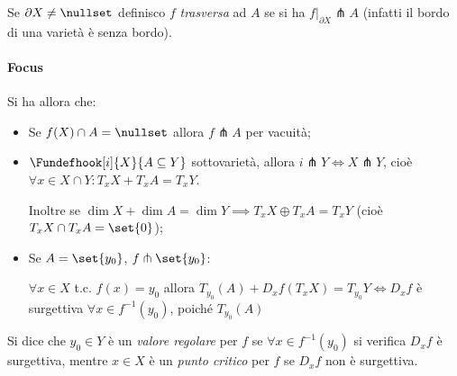 \begin{defn}
Se $\partial X \neq \nullset$ definisco $f$ \emph{trasversa} ad $A$ se si ha $f|_{\partial X} \pitchfork A$ (infatti il bordo di una varietà è senza bordo).
\end{defn}

\paragraph{Focus}
Si ha allora che:
\begin{itemize}
\item Se $f(X) \cap A = \nullset$ allora $f \pitchfork A$ per vacuità;
\item $\Fundefhook[i]{X}{A \subseteq Y}$ sottovarietà, allora $i \pitchfork Y \iff X \pitchfork Y$, cioè $\forall x \in X\cap Y: T_xX + T_xA = T_xY$.

Inoltre se $\dim X +\dim A = \dim Y \implies T_xX \oplus T_xA = T_xY$ (cioè $T_xX \cap T_xA = \set{0}$);
\item Se $A = \set{y_0}$, $f \pitchfork \set{y_0}$:

$\forall x \in X$ t.c. $f(x) = y_0$ allora $T_{y_0}(A) + D_xf(T_xX) = T_{y_0}Y \iff D_xf$ è surgettiva $\forall x \in f^{-1}(y_0)$, poiché $T_{y_0}(A)$
\end{itemize}

\begin{defn}
Si dice che $y_0 \in Y$ è un \emph{valore regolare} per $f$ se $\forall x \in f^{-1}(y_0)$ si verifica $D_xf$ è surgettiva, mentre $x \in X$ è un \emph{punto critico} per $f$ se $D_xf$ non è surgettiva.
\end{defn}
